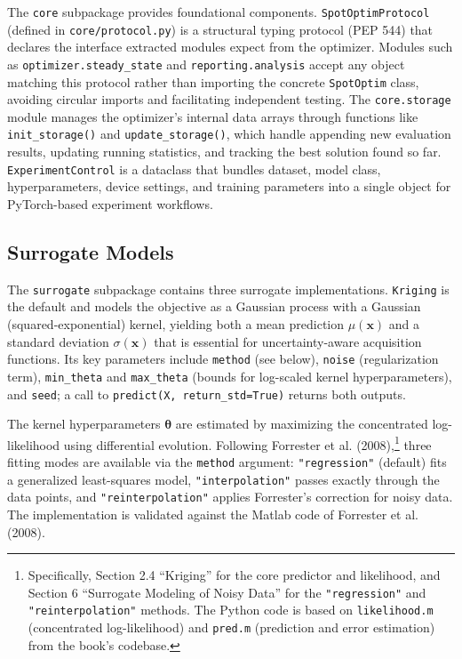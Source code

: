 \documentclass[
  twocolumn]{article}
\begin{document}
The \texttt{core} subpackage provides foundational components.
\texttt{SpotOptimProtocol} (defined in \texttt{core/protocol.py}) is a
structural typing protocol (PEP 544) that declares the interface
extracted modules expect from the optimizer. Modules such as
\texttt{optimizer.steady\_state} and \texttt{reporting.analysis} accept
any object matching this protocol rather than importing the concrete
\texttt{SpotOptim} class, avoiding circular imports and facilitating
independent testing. The \texttt{core.storage} module manages the
optimizer's internal data arrays through functions like
\texttt{init\_storage()} and \texttt{update\_storage()}, which handle
appending new evaluation results, updating running statistics, and
tracking the best solution found so far. \texttt{ExperimentControl} is a
dataclass that bundles dataset, model class, hyperparameters, device
settings, and training parameters into a single object for PyTorch-based
experiment workflows.

\subsection{Surrogate Models}\label{sec-surrogate}

The \texttt{surrogate} subpackage contains three surrogate
implementations. \texttt{Kriging} is the default and models the
objective as a Gaussian process with a Gaussian (squared-exponential)
kernel, yielding both a mean prediction \(\mu(\mathbf{x})\) and a
standard deviation \(\sigma(\mathbf{x})\) that is essential for
uncertainty-aware acquisition functions. Its key parameters include
\texttt{method} (see below), \texttt{noise} (regularization term),
\texttt{min\_theta} and \texttt{max\_theta} (bounds for log-scaled
kernel hyperparameters), and \texttt{seed}; a call to
\texttt{predict(X,\ return\_std=True)} returns both outputs.

The kernel hyperparameters \(\boldsymbol{\theta}\) are estimated by
maximizing the concentrated log-likelihood using differential evolution.
Following Forrester et al. (2008),\footnote{Specifically, Section 2.4
  ``Kriging'' for the core predictor and likelihood, and Section 6
  ``Surrogate Modeling of Noisy Data'' for the \texttt{"regression"} and
  \texttt{"reinterpolation"} methods. The Python code is based on
  \texttt{likelihood.m} (concentrated log-likelihood) and
  \texttt{pred.m} (prediction and error estimation) from the book's
  codebase.} three fitting modes are available via the \texttt{method}
argument: \texttt{"regression"} (default) fits a generalized
least-squares model, \texttt{"interpolation"} passes exactly through the
data points, and \texttt{"reinterpolation"} applies Forrester's
correction for noisy data. The implementation is validated against the
Matlab code of Forrester et al. (2008).
\end{document}
